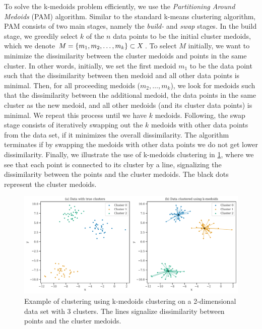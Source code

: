 To solve the k-medoids problem efficiently, we use the \textit{Partitioning Around Medoids} (PAM) algorithm. Similar to the standard k-means clustering algorithm, PAM consists of two main stages, namely the \textit{build-} and \textit{swap} stages. In the build stage, we greedily select $k$ of the $n$ data points to be the initial cluster medoids, which we denote $M = \left\{m_1, m_2, \ldots, m_k\right\} \subset X$. To select $M$ initially, we want to minimize the dissimilarity between the cluster medoids and points in the same cluster. In other words, initially, we set the first medoid $m_1$ to be the data point such that the dissimilarity between then medoid and all other data points is minimal. Then, for all proceeding medoids ($m_2, \ldots, m_k$), we look for medoids such that the dissimilarity between the additional medoid, the data points in the same cluster as the new medoid, and all other medoids (and its cluster data points) is minimal. We repeat this process until we have $k$ medoids. Following, the swap stage consists of iteratively swapping out the $k$ medoids with other data points from the data set, if it minimizes the overall dissimilarity. The algorithm terminates if by swapping the medoids with other data points we do not get lower dissimilarity. Finally, we illustrate the use of k-medoids clustering in \cref{fig:k-medoids-clustering-2d-example}, where we see that each point is connected to its cluster by a line, signalizing the dissimilarity between the points and the cluster medoids. The black dots represent the cluster medoids.
\begin{figure}[H]
    \centering
    \includegraphics[width=\textwidth]{thesis/figures/k-medoids-clustering-2d-example.pdf}
    \caption{Example of clustering using k-medoids clustering on a 2-dimensional data set with 3 clusters. The lines signalize dissimilarity between points and the cluster medoids.}
    \label{fig:k-medoids-clustering-2d-example}
\end{figure}

